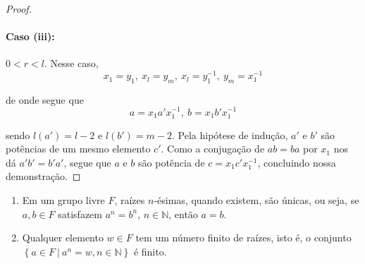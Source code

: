 \begin{proof}
    		\paragraph{Caso (iii):} $0 < r < l$. Nesse caso, 
    		\begin{equation*}
    		    x_1 = y_1, \ x_l = y_m, \ x_l = y_1^{-1}, \ y_m = x_1^{-1}
    		\end{equation*}
    		\par\vspace{0.3cm} de onde segue que
    		\begin{equation*}
    		    a = x_1a'x_1^{-1}, \ b = x_1b'x_1^{-1}
    		\end{equation*}
    		\par\vspace{0.3cm} sendo $l(a') = l-2$ e $l(b') = m-2$. Pela hipótese de indução, $a'$ e $b'$ 
    		são potências de um mesmo elemento $c'$. Como a conjugação de $ab=ba$ por $x_1$ nos dá $a'b' = b'a'$,
    		segue que $a$ e $b$ são potência de $c = x_1c'x_1^{-1}$, concluindo nossa demonstração. 
    	\end{proof}
    	\begin{prop}
    	\label{raizes n-esimas em grupos livres}
    		\begin{enumerate}
    			\item Em um grupo livre $F$, raízes $n$-ésimas, quando existem, são únicas, ou seja,
    			se $a,b\in F$ satisfazem $a^n = b^n$, $n\in\mathbb{N}$, então $a = b$.
    			\item Qualquer elemento $w\in F$ tem um número finito de raízes, isto é, o conjunto 
    			$\left\{ a\in F \ \vert \ a^n = w, n\in\mathbb{N} \right\}$ é finito.
    		\end{enumerate}
    	\end{prop}
